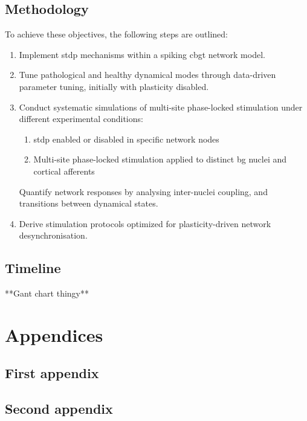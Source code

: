 \subsection{Methodology}
To achieve these objectives, the following steps are outlined:
\begin{enumerate}[nosep]
	\item Implement \acrshort{stdp} mechanisms within a spiking \acrshort{cbgt} network model.
	\item Tune pathological and healthy dynamical modes through data-driven parameter tuning, initially with plasticity disabled.
	\item Conduct systematic simulations of multi-site phase-locked stimulation under different experimental conditions:
	      \begin{enumerate}[nosep, label=\alph*.]
		      \item \acrshort{stdp} enabled or disabled in specific network nodes
		      \item Multi-site phase-locked stimulation applied to distinct \acrshort{bg} nuclei and cortical afferents
	      \end{enumerate}
	      Quantify network responses by analysing inter-nuclei coupling, and transitions between dynamical states.
	\item Derive stimulation protocols optimized for plasticity-driven network desynchronisation.
\end{enumerate}

\subsection{Timeline}
**Gant chart thingy**


\newpage


\newpage

\appendix
\section*{Appendices}
\renewcommand{\thesubsection}{\Alph{subsection}}
\subsection{First appendix}
\subsection{Second appendix}




